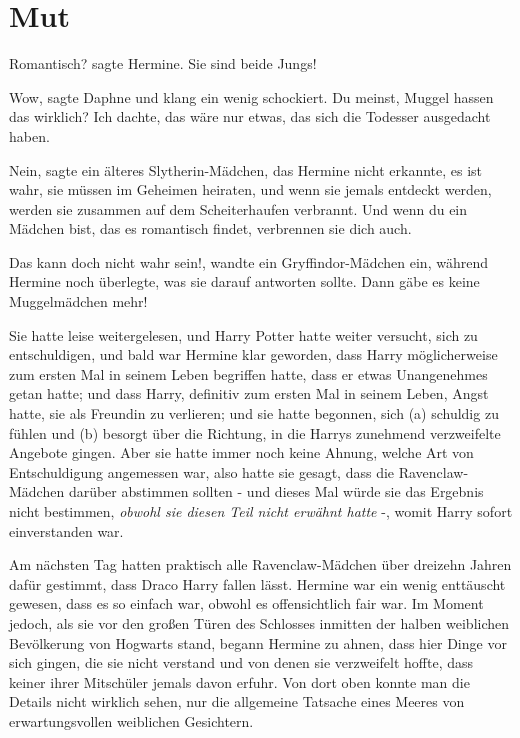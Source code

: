 \chapter{Mut}

\glqq{}Romantisch?\grqq{} sagte Hermine. \glqq{}Sie sind beide Jungs!\grqq{}

\glqq{}Wow\grqq{}, sagte Daphne und klang ein wenig schockiert. \glqq{}Du meinst,
Muggel hassen das wirklich? Ich dachte, das wäre nur etwas, das sich die
Todesser ausgedacht haben.\grqq{}

\glqq{}Nein\grqq{}, sagte ein älteres Slytherin-Mädchen, das Hermine nicht
erkannte, \glqq{}es ist wahr, sie müssen im Geheimen heiraten, und wenn sie
jemals entdeckt werden, werden sie zusammen auf dem Scheiterhaufen verbrannt.
Und wenn du ein Mädchen bist, das es romantisch findet, verbrennen sie dich
auch.\grqq{}

\glqq{}Das kann doch nicht wahr sein!\grqq{}, wandte ein Gryffindor-Mädchen ein,
während Hermine noch überlegte, was sie darauf antworten sollte. \glqq{}Dann gäbe
es keine Muggelmädchen mehr!\grqq{}

Sie hatte leise weitergelesen, und Harry Potter hatte weiter versucht, sich zu
entschuldigen, und bald war Hermine klar geworden, dass Harry möglicherweise zum
ersten Mal in seinem Leben begriffen hatte, dass er etwas Unangenehmes getan
hatte; und dass Harry, definitiv zum ersten Mal in seinem Leben, Angst hatte,
sie als Freundin zu verlieren; und sie hatte begonnen, sich (a) schuldig zu
fühlen und (b) besorgt über die Richtung, in die Harrys zunehmend verzweifelte
Angebote gingen. Aber sie hatte immer noch keine Ahnung, welche Art von
Entschuldigung angemessen war, also hatte sie gesagt, dass die Ravenclaw-Mädchen
darüber abstimmen sollten - und dieses Mal würde sie das Ergebnis nicht
bestimmen, \emph{obwohl sie diesen Teil nicht erwähnt hatte} -, womit Harry
sofort einverstanden war.

Am nächsten Tag hatten praktisch alle Ravenclaw-Mädchen über dreizehn Jahren
dafür gestimmt, dass Draco Harry fallen lässt. Hermine war ein wenig enttäuscht
gewesen, dass es so einfach war, obwohl es offensichtlich fair war. Im Moment
jedoch, als sie vor den großen Türen des Schlosses inmitten der halben
weiblichen Bevölkerung von Hogwarts stand, begann Hermine zu ahnen, dass hier
Dinge vor sich gingen, die sie nicht verstand und von denen sie verzweifelt
hoffte, dass keiner ihrer Mitschüler jemals davon erfuhr. Von dort oben konnte
man die Details nicht wirklich sehen, nur die allgemeine Tatsache eines Meeres
von erwartungsvollen weiblichen Gesichtern.

